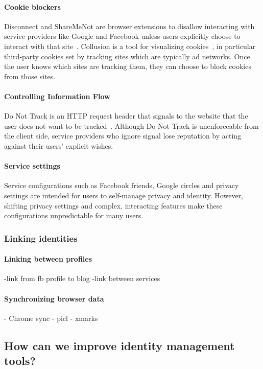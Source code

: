 \documentclass[10pt, conference, compsocconf]{IEEEtran}
\begin{document}
\paragraph{Cookie blockers}
Disconnect and ShareMeNot are browser extensions to disallow interacting with
service providers like Google and Facebook unless users explicitly choose to
interact with that site~\cite{disconnect,franzi}.  Collusion is a tool for
visualizing cookies~\cite{collusion}, in particular third-party cookies set by
tracking sites which are typically ad networks.  Once the user knows which
sites are tracking them, they can choose to block cookies from those sites.

\paragraph{Controlling Information Flow}
Do Not Track is an HTTP request header that signals to the website that the
user does not want to be tracked~\cite{dnt}. Although Do Not Track is
unenforceable from the client side, service providers who ignore signal
lose reputation by acting against their users' explicit wishes.

\paragraph{Service settings} Service configurations such as Facebook friends,
Google circles and privacy settings are intended for users to self-manage
privacy and identity. However, shifting privacy settings and complex,
interacting features make these configurations unpredictable for many users.

\subsubsection{Linking identities}
\paragraph{Linking between profiles}

-link from fb profile to blog
-link between services

\paragraph{Synchronizing browser data}

- Chrome sync
- picl
- xmarks

\subsection{How can we improve identity management tools?}
\end{document}
